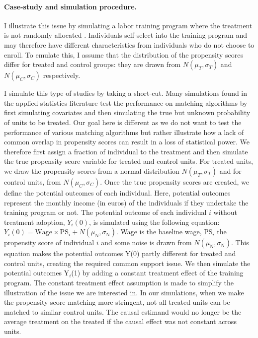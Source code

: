 \documentclass[usletter, 12pt]{article}
\begin{document}
       	 	\paragraph{Case-study and simulation procedure.} I illustrate this issue by simulating a labor training program where the treatment is not randomly allocated \citep{dehejia_causal_1999}. Individuals self-select into the training program and may therefore have different characteristics from individuals who do not choose to enroll. To emulate this, I assume that the distribution of the propensity scores differ for treated and control groups: they are drawn from $N(\mu_T,\sigma_T)$ and $N(\mu_C, \sigma_C)$ respectively.
		
		I simulate this type of studies by taking a short-cut. Many simulations found in the applied statistics literature test the performance on matching algorithms by first simulating covariates and then simulating the true but unknown probability of units to be treated. Our goal here is different as we do not want to test the performance of various matching algorithms but rather illustrate how a lack of common overlap in propensity scores can result in a loss of statistical power. We therefore first assign a fraction of individual to the treatment and then simulate the true propensity score variable for treated and control units. For treated units, we draw the propensity scores from a normal distribution $N(\mu_T,\sigma_T)$ and for control units, from $N(\mu_C, \sigma_C)$. Once the true propensity scores are created, we define the potential outcomes of each individual. Here, potential outcomes represent the monthly income (in euros) of the individuals if they undertake the training program or not. The potential outcome of each individual $i$ without treatment adoption, $Y_{i}(0)$, is simulated using the following equation: $Y_i(0)=\text{Wage}\times\text{PS}_i+N(\mu_{\text{N}},\sigma_{\text{N}})$. Wage is the baseline wage, PS$_{i}$ the propensity score of individual $i$ and some noise is drawn from $N(\mu_{\text{N}},\sigma_{\text{N}})$. This equation makes the potential outcomes Y(0) partly different for treated and control units, creating the required common support issue. We then simulate the potential outcomes Y$_i$(1) by adding a constant treatment effect of the training program. The constant treatment effect assumption is made to simplify the illustration of the issue we are interested in. In our simulations, when we make the propensity score matching more stringent, not all treated units can be matched to similar control units. The causal estimand would no longer be the average treatment on the treated if the causal effect was not constant across units.  
        
\end{document}
